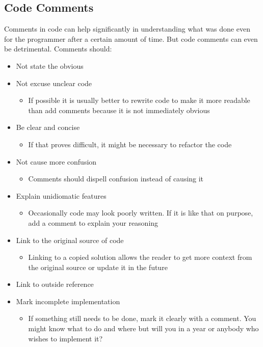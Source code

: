 \documentclass{article}
\begin{document}
	\subsection{Code Comments}
	Comments in code can help significantly in understanding what was done even for the programmer after a certain amount of time. But code comments can even be detrimental. Comments should:
	\begin{itemize}
		\item{Not state the obvious}
		\item{Not excuse unclear code}
		\begin{itemize}
			\item{If possible it is usually better to rewrite code to make it more readable than add comments because it is not immediately obvious}
		\end{itemize}
		\item{Be clear and concise}
		\begin{itemize}
			\item{If that proves difficult, it might be necessary to refactor the code}
		\end{itemize}
		\item{Not cause more confusion}
		\begin{itemize}
			\item{Comments should dispell confusion instead of causing it}
		\end{itemize}
		\item{Explain unidiomatic features}
		\begin{itemize}
			\item{Occasionally code may look poorly written. If it is like that on purpose, add a comment to explain your reasoning}
		\end{itemize}
		\item{Link to the original source of code}
		\begin{itemize}
			\item{Linking to a copied solution allows the reader to get more context from the original source or update it in the future}
		\end{itemize}
		\item{Link to outside reference}
		\item{Mark incomplete implementation}
		\begin{itemize}
			\item{If something still needs to be done, mark it clearly with a comment. You might know what to do and where but will you in a year or anybody who wishes to implement it?}
		\end{itemize}
	\end{itemize}
\end{document}
